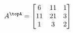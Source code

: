 \documentclass[preview]{standalone}
\begin{document}
\begin{align*}
A^\topA=\left[\begin{matrix}6&11&1\\11&21&3\\1&3&2\end{matrix}\right]
\end{align*}
\end{document}
